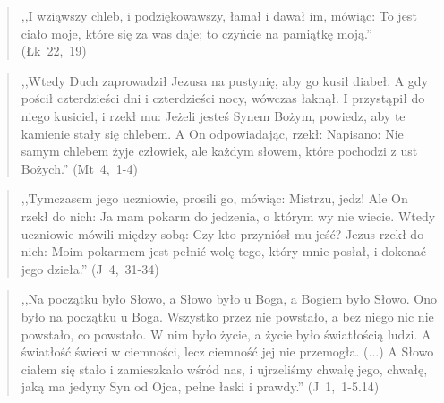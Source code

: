 \documentclass[10pt,a4paper,oneside]{article}
\begin{document}
\begin{quote}
,,I wziąwszy chleb, i podziękowawszy, łamał i dawał im, mówiąc: To jest ciało moje, które się za was daje; to czyńcie na pamiątkę moją.'' \mbox{(Łk 22, 19)}
\end{quote}
\begin{quote}
,,Wtedy Duch zaprowadził Jezusa na pustynię, aby go kusił diabeł. A gdy pościł czterdzieści dni i czterdzieści nocy, wówczas łaknął. I przystąpił do niego kusiciel, i rzekł mu: Jeżeli jesteś Synem Bożym, powiedz, aby te kamienie stały się chlebem. A On odpowiadając, rzekł: Napisano: Nie samym chlebem żyje człowiek, ale każdym słowem, które pochodzi z ust Bożych.'' \mbox{(Mt 4, 1-4)}
\end{quote}
\begin{quote}
,,Tymczasem jego uczniowie, prosili go, mówiąc: Mistrzu, jedz! Ale On rzekł do nich: Ja mam pokarm do jedzenia, o którym wy nie wiecie. Wtedy uczniowie mówili między sobą: Czy kto przyniósł mu jeść? Jezus rzekł do nich: Moim pokarmem jest pełnić wolę tego, który mnie posłał, i dokonać jego dzieła.'' \mbox{(J 4, 31-34)}
\end{quote}
\begin{quote}
,,Na początku było Słowo, a Słowo było u Boga, a Bogiem było Słowo. Ono było na początku u Boga. Wszystko przez nie powstało, a bez niego nic nie powstało, co powstało. W nim było życie, a życie było światłością ludzi. A światłość świeci w ciemności, lecz ciemność jej nie przemogła. (...) A Słowo ciałem się stało i zamieszkało wśród nas, i ujrzeliśmy chwałę jego, chwałę, jaką ma jedyny Syn od Ojca, pełne łaski i prawdy.'' \mbox{(J 1, 1-5.14)}
\end{quote}
\end{document}
